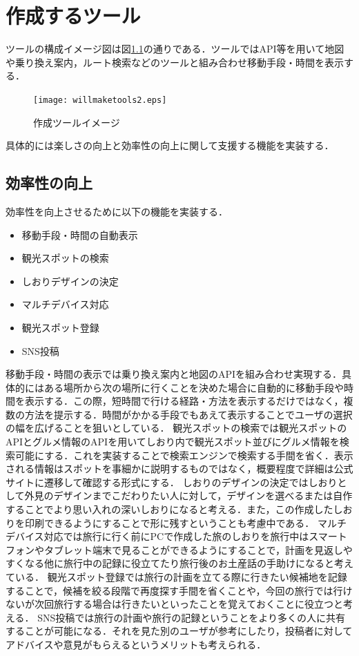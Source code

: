 \documentclass{funthesis}
\begin{document}
\chapter{作成するツール}%

ツールの構成イメージ図は図\ref{Ltoolimg}の通りである．ツールではAPI等を用いて地図や乗り換え案内，ルート検索などのツールと組み合わせ移動手段・時間を表示する．
\begin{figure}[htpb]
\begin{center}
\texttt{[image: willmaketools2.eps]}
\end{center}
\caption{作成ツールイメージ}
\label{Ltoolimg}
\end{figure}

具体的には楽しさの向上と効率性の向上に関して支援する機能を実装する．

\section{効率性の向上}
効率性を向上させるために以下の機能を実装する．
\begin{itemize}
 \item 移動手段・時間の自動表示
 \item 観光スポットの検索
 \item しおりデザインの決定
 \item マルチデバイス対応
 \item 観光スポット登録
  \item SNS投稿
\end{itemize}
移動手段・時間の表示では乗り換え案内と地図のAPIを組み合わせ実現する．具体的にはある場所から次の場所に行くことを決めた場合に自動的に移動手段や時間を表示する．この際，短時間で行ける経路・方法を表示するだけではなく，複数の方法を提示する．時間がかかる手段でもあえて表示することでユーザの選択の幅を広げることを狙いとしている．
観光スポットの検索では観光スポットのAPIとグルメ情報のAPIを用いてしおり内で観光スポット並びにグルメ情報を検索可能にする．これを実装することで検索エンジンで検索する手間を省く．表示される情報はスポットを事細かに説明するものではなく，概要程度で詳細は公式サイトに遷移して確認する形式にする．
しおりのデザインの決定ではしおりとして外見のデザインまでこだわりたい人に対して，デザインを選べるまたは自作することでより思い入れの深いしおりになると考える．また，この作成したしおりを印刷できるようにすることで形に残すということも考慮中である．
マルチデバイス対応では旅行に行く前にPCで作成した旅のしおりを旅行中はスマートフォンやタブレット端末で見ることができるようにすることで，計画を見返しやすくなる他に旅行中の記録に役立てたり旅行後のお土産話の手助けになると考えている．
観光スポット登録では旅行の計画を立てる際に行きたい候補地を記録することで，候補を絞る段階で再度探す手間を省くことや，今回の旅行では行けないが次回旅行する場合は行きたいといったことを覚えておくことに役立つと考える．
SNS投稿では旅行の計画や旅行の記録ということをより多くの人に共有することが可能になる．それを見た別のユーザが参考にしたり，投稿者に対してアドバイスや意見がもらえるというメリットも考えられる．
\end{document}
